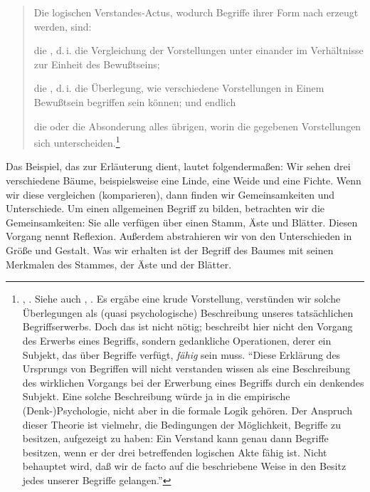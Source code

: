 \begin{quote}
Die logischen Verstandes-Actus, wodurch Begriffe ihrer Form nach erzeugt werden,
sind:
\begin{nummerierung}
\item die , d.\,i. die Vergleichung der Vorstellungen unter
einander im Verhältnisse zur Einheit des Bewußtseins;
\item die , d.\,i. die Überlegung, wie verschiedene Vorstellungen
in Einem Bewußtsein begriffen sein können; und endlich
\item die  oder die Absonderung alles übrigen, worin die
gegebenen Vorstellungen sich
unterscheiden.\footnote{\cite[][\S~6]{Kant:ImmanuelKantsLogik1977},
\cite[][IX: 94.20--27]{Kant:GesammelteWerke1900ff.}. Siehe auch
\cite[][]{Kant:Reflexionen1900ff.}, \cite[][XVI:
547.8--13]{Kant:GesammelteWerke1900ff.}. Es ergäbe eine krude Vorstellung,
verstünden wir solche Überlegungen als (quasi psychologische) Beschreibung unseres tatsächlichen
Begriffserwerbs. Doch das ist nicht nötig;  beschreibt
hier nicht den Vorgang des Erwerbs eines Begriffs, sondern gedankliche
Operationen, derer ein Subjekt, das über Begriffe verfügt, \emph{fähig} sein
muss. \cite[Vgl.][\pno~82\,f.:]{Stuhlmann-Laeisz:KantsLogik1976} \enquote{Diese
Erklärung des Ursprungs von Begriffen will  nicht verstanden wissen als eine
Beschreibung des wirklichen Vorgangs bei der Erwerbung eines Begriffs durch ein
denkendes Subjekt. Eine solche Beschreibung würde ja in die empirische
(Denk-)Psychologie, nicht aber in die formale Logik gehören. Der Anspruch dieser
Theorie ist vielmehr, die Bedingungen der Möglichkeit, Begriffe zu besitzen,
aufgezeigt zu haben: Ein Verstand kann genau dann Begriffe besitzen, wenn er der
drei betreffenden logischen Akte fähig ist. Nicht behauptet wird, daß wir de
facto auf die beschriebene Weise in den Besitz jedes unserer Begriffe
gelangen.}}
\end{nummerierung}
\end{quote}
Das Beispiel, das zur Erläuterung dient, lautet folgendermaßen: Wir sehen drei
verschiedene Bäume, beispielsweise eine Linde, eine Weide und eine Fichte. Wenn
wir diese vergleichen (komparieren), dann finden wir Gemeinsamkeiten und
Unterschiede. Um einen allgemeinen Begriff zu bilden, betrachten wir die
Gemeinsamkeiten: Sie alle verfügen über einen Stamm, Äste und Blätter. Diesen
Vorgang nennt  Reflexion. Außerdem abstrahieren wir von den
Unterschieden in Größe und Gestalt. Was wir erhalten ist der Begriff des Baumes
mit seinen Merkmalen des Stammes, der Äste und der Blätter.

